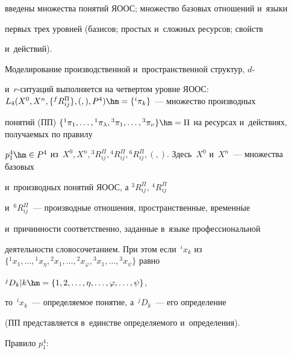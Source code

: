 введены множества понятий ЯООС; множество базовых отношений и~языки 

первых трех уровней (базисов; простых и~сложных ресурсов; свойств 

и~действий). 

  

  Моделирование производственной и~пространственной структур, $d$-  

и~$r$-си\-ту\-аций выполняется на четвертом уровне ЯООС: $L_4(X^0, X^n, 

\{{}^f R_{ij}^\Pi\}, (,), P^4)\hm= \{{}^i\pi_k\}$~--- множество производных 

понятий (ПП) $\{{}^1\pi_1,\ldots , {}^1\pi_\lambda, {}^3\pi_1,\ldots , 

{}^3\pi_\nu\}\hm= \Pi$ на ресурсах и~действиях, получаемых по правилу 

$p_1^4\hm\in P^4$ из~$X^0, X^n, {}^3R_{ij}^{\Pi}, {}^4 R_{ij}^{\Pi}, 

{}^6R_{ij}^{\Pi}, (,)$. Здесь~$X^0$ и~$X^n$~--- множества базовых 

и~производных понятий ЯООС, а ${}^3R_{ij}^{\Pi}$, ${}^4R_{ij}^{\Pi}$ 

и~${}^6R_{ij}^{\Pi}$~--- производные отношения, пространственные, временн$\acute{\mbox{ы}}$е 

и~причинности соответственно, заданные в~языке профессиональной 

деятельности словосочетанием. При этом если~${}^i x_k$ из $\{ {}^1x_1,\ldots , 

{}^1x_\eta, {}^2x_1,\ldots , {}^2x_\varphi, {}^3x_1,\ldots , {}^3x_\psi\}$ равно 

${}^j D_k\vert k\hm= \{ 1,2,\ldots , \eta,\ldots , \varphi, \ldots , \psi\}$, 

то~${}^i x_k$~--- определяемое понятие, а~${}^j D_k$~--- его определение 

(ПП представляется в~единстве определяемого и~определения).

  

  Правило $p_1^4$: 

